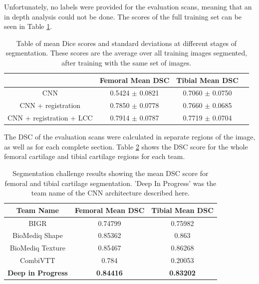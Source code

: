\documentclass[11pt,a4paper]{memoir}
\numberwithin{figure}{section}
\numberwithin{table}{section}
\numberwithin{equation}{section}
\begin{document}
Unfortunately, no labels were provided for the evaluation scans, meaning that an in depth analysis could not be done. The scores of the full training set can be seen in Table \ref{table:chall}.\\

\begin{table}[!h]
\centering
\caption[DSC Scores for the training data provided for the IWOAI Segmentation Challenge]{Table of mean Dice scores and standard deviations at different stages of segmentation. These scores are the average over all training images segmented, after training with the same set of images.}
\begin{tabular}{|c|c|c|c|}
\hline
                          & Femoral Mean DSC  & Tibial Mean DSC \\ \hline
CNN                       & 0.5424  $\pm$     0.0821     & 0.7060  $\pm$   0.0750   \\\hline
CNN + registration         & 0.7850 $\pm$    0.0778     & 0.7660   $\pm$    0.0685   \\ \hline
CNN + registration + LCC   & 0.7914 $\pm$    0.0787     & 0.7719   $\pm$    0.0704   \\ \hline


\end{tabular}

\label{table:chall}
\end{table}

The DSC of the evaluation scans were calculated in separate regions of the image, as well as for each complete section. Table \ref{results} shows the DSC score for the whole femoral cartilage and tibial cartilage regions for each team. \\

\begin{table}[!h]
\centering
\caption[DSC scores for each team entered into the IWOAI Segmentation Challenge]{Segmentation challenge results showing the mean DSC score for femoral and tibial cartilage segmentation. 'Deep In Progress' was the team name of the CNN architecture described here.}

\begin{tabular}{|c|c|c|}
\hline
Team Name                 & Femoral Mean DSC & Tibial Mean DSC  \\ \hline
BIGR                      & 0.74799          & 0.75982          \\ \hline
BioMediq Shape            & 0.85362          & 0.863            \\ \hline
BioMediq Texture          & 0.85467          & 0.86268          \\ \hline
CombiVTT                  & 0.784            & 0.20053          \\ \hline
\textbf{Deep in Progress} & \textbf{0.84416} & \textbf{0.83202} \\ \hline
\end{tabular}

\label{results}
\end{table}
\end{document}
